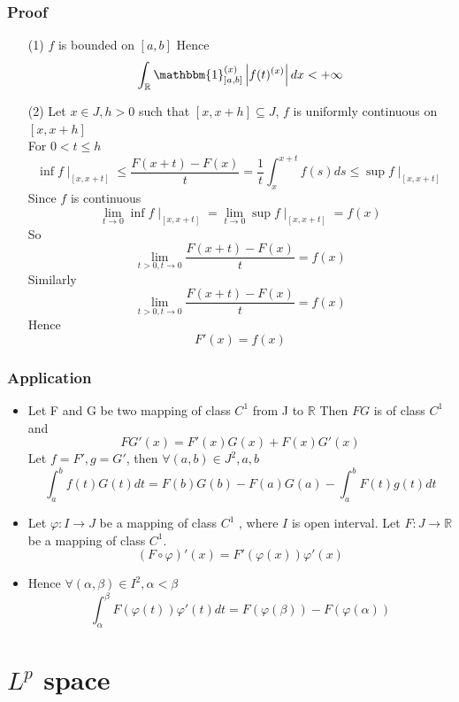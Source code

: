 \documentclass{book}
\newcommand{\abs}[1]{\left\lvert #1 \right\rvert}
\newcommand{\rightbracket}{]}
\begin{document}
\subsection{Proof}
\begin{itemize}
    \item [(1)]$f$ is bounded on $[a,b]$ Hence$$\int_\mathbb{R}\mathbbm{1}_{\rightbracket a,b\rightbracket}^{(x)}\abs{f(t)^{(x)}}dx<+\infty$$
    \item [(2)]Let $x\in J,h>0$ such that $[x,x+h]\subseteq J$, $f$ is uniformly continuous on $[x,x+h]$\\ For $0<t\leq h$
    $$\inf f\mid_{[x,x+t]}\leq\frac{F(x+t)-F(x)}{t}=\frac{1}{t}\int_{x}^{x+t}f(s)ds\leq \sup f\mid_{[x,x+t]}$$Since $f$ is continuous $$\lim\limits_{t\rightarrow 0}\inf f\mid_{[x,x+t]}=\lim\limits_{t\rightarrow 0}\sup f\mid_{[x,x+t]}=f(x)$$
    So $$\lim\limits_{t>0,t\rightarrow 0}\frac{F(x+t)-F(x)}{t}=f(x)$$
    Similarly$$\lim\limits_{t>0,t\rightarrow 0}\frac{F(x+t)-F(x)}{t}=f(x)$$Hence $$F'(x)=f(x)$$
\end{itemize}
\subsection*{Application}
\begin{itemize}
    \item Let F and G be two mapping of class $C^1$ from J to $\mathbb{R}$ Then $FG$ is of class $C^1$ and $$FG'(x)=F'(x)G(x)+F(x)G'(x)$$Let $f=F',g=G'$, then $\forall(a,b)\in J^2,a,b$ $$\int_a^bf(t)G(t)dt=F(b)G(b)-F(a)G(a)-\int_a^bF(t)g(t)dt$$
    \item Let $\varphi:I\rightarrow J$ be a mapping of class $C^1$ , where $I$ is open interval. Let $F:J\rightarrow\mathbb{R}$ be a mapping of class $C^1$. $$(F\circ \varphi)'(x)=F'(\varphi(x))\varphi'(x)$$
    \item Hence $\forall(\alpha,\beta)\in I^2,\alpha<\beta$ $$\int_\alpha^\beta F(\varphi(t))\varphi'(t)dt=F(\varphi(\beta))-F(\varphi(\alpha))$$
\end{itemize}
\chapter{$L^p$ space}
\end{document}
